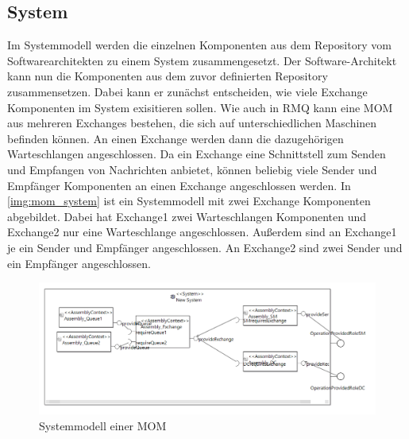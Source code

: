 \subsection{System}
Im Systemmodell werden die einzelnen Komponenten aus dem Repository vom Softwarearchitekten zu einem System zusammengesetzt. Der Software-Architekt kann nun die Komponenten aus dem zuvor definierten Repository zusammensetzen. Dabei kann er zunächst entscheiden, wie viele Exchange Komponenten im System exisitieren sollen. Wie auch in RMQ kann eine MOM aus mehreren Exchanges bestehen, die sich auf unterschiedlichen Maschinen befinden können. An einen Exchange werden dann die dazugehörigen Warteschlangen angeschlossen. Da ein Exchange eine Schnittstell zum Senden und Empfangen von Nachrichten anbietet, können beliebig viele Sender und Empfänger Komponenten an einen Exchange angeschlossen werden. In \autoref{img:mom_system} ist ein Systemmodell mit zwei Exchange Komponenten abgebildet. Dabei hat Exchange1 zwei Warteschlangen Komponenten und Exchange2 nur eine Warteschlange angeschlossen. Außerdem sind an Exchange1 je ein Sender und Empfänger angeschlossen. An Exchange2 sind zwei Sender und ein Empfänger angeschlossen. 

\begin{figure}
\center
  \includegraphics[width=1\textwidth]{images/mom_system.png}
  \caption{Systemmodell einer MOM}
  \label{img:mom_system}
\end{figure}
